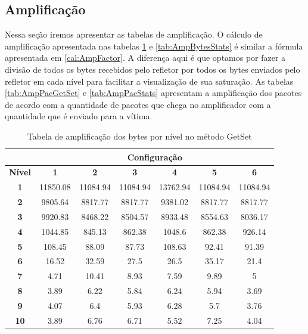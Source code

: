 \subsection{Amplificação}

Nessa seção iremos apresentar as tabelas de amplificação. O cálculo de amplificação apresentada nas tabelas \ref{tab:AmpBytesGetSet} e \ref{tab:AmpBytesStats} é similar a fórmula apresentada em \ref{cal:AmpFactor}. A diferença aqui é que optamos por fazer a divisão de todos os bytes recebidos pelo refletor por todos os bytes enviados pelo refletor em cada nível para facilitar a visualização de sua saturação. As tabelas \ref{tab:AmpPacGetSet} e \ref{tab:AmpPacStats} apresentam a amplificação dos pacotes de acordo com a quantidade de pacotes que chega no amplificador com a quantidade que é enviado para a vítima. 

\begin{table}[H]
\centering
\caption{Tabela de amplificação dos bytes por nível no método GetSet}
\label{tab:AmpBytesGetSet}
\begin{tabular}{|c|c|c|c|c|c|c|}
\hline
               & \multicolumn{6}{c|}{\textbf{Configuração}}                                  \\ \hline
\textbf{Nível} & \textbf{1} & \textbf{2} & \textbf{3} & \textbf{4} & \textbf{5} & \textbf{6} \\ \hline
\textbf{1}     & 11850.08   & 11084.94   & 11084.94   & 13762.94   & 11084.94   & 11084.94   \\ \hline
\textbf{2}     & 9805.64    & 8817.77    & 8817.77    & 9381.02    & 8817.77    & 8817.77    \\ \hline
\textbf{3}     & 9920.83    & 8468.22    & 8504.57    & 8933.48    & 8554.63    & 8036.17    \\ \hline
\textbf{4}     & 1044.85    & 845.13     & 862.38     & 1048.6     & 862.38     & 926.14     \\ \hline
\textbf{5}     & 108.45     & 88.09      & 87.73      & 108.63     & 92.41      & 91.39      \\ \hline
\textbf{6}     & 16.52      & 32.59      & 27.5       & 26.5       & 35.17      & 21.4       \\ \hline
\textbf{7}     & 4.71       & 10.41      & 8.93       & 7.59       & 9.89       & 5          \\ \hline
\textbf{8}     & 3.89       & 6.22       & 5.84       & 6.24       & 5.94       & 3.69       \\ \hline
\textbf{9}     & 4.07       & 6.4        & 5.93       & 6.28       & 5.7        & 3.76       \\ \hline
\textbf{10}    & 3.89       & 6.76       & 6.71       & 5.52       & 7.25       & 4.04       \\ \hline
\end{tabular}
\end{table}

